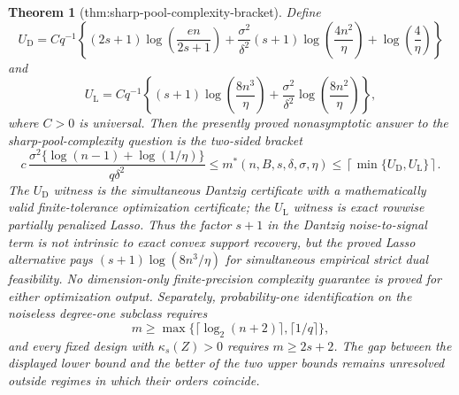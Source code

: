 \documentclass{article}
\newtheorem{theorem}{Theorem}
\begin{document}
\begin{theorem}[thm:sharp-pool-complexity-bracket]\label{thm:sharp-pool-complexity-bracket}
Define
\[
 U_{\mathrm D}=Cq^{-1}\left\{(2s+1)\log\!\left(\frac{en}{2s+1}\right)
 +\frac{\sigma^2}{\delta^2}(s+1)\log\!\left(\frac{4n^2}{\eta}\right)
 +\log\!\left(\frac4\eta\right)\right\}
\]
and
\[
 U_{\mathrm L}=Cq^{-1}\left\{(s+1)\log\!\left(\frac{8n^3}{\eta}\right)
 +\frac{\sigma^2}{\delta^2}\log\!\left(\frac{8n^2}{\eta}\right)\right\},
\]
where \(C>0\) is universal.  Then the presently proved nonasymptotic answer to the sharp-pool-complexity question is the two-sided bracket
\[
 c\,\frac{\sigma^2\{\log(n-1)+\log(1/\eta)\}}{q\delta^2}
 \le m^*(n,B,s,\delta,\sigma,\eta)
 \le \left\lceil\min\{U_{\mathrm D},U_{\mathrm L}\}\right\rceil.
\]
The \(U_{\mathrm D}\) witness is the simultaneous Dantzig certificate with a mathematically valid finite-tolerance optimization certificate; the \(U_{\mathrm L}\) witness is exact rowwise partially penalized Lasso.  Thus the factor \(s+1\) in the Dantzig noise-to-signal term is not intrinsic to exact convex support recovery, but the proved Lasso alternative pays \((s+1)\log(8n^3/\eta)\) for simultaneous empirical strict dual feasibility.  No dimension-only finite-precision complexity guarantee is proved for either optimization output.  Separately, probability-one identification on the noiseless degree-one subclass requires
\[
 m\ge\max\{\lceil\log_2(n+2)\rceil,\lceil1/q\rceil\},
\]
and every fixed design with \(\kappa_s(Z)>0\) requires \(m\ge2s+2\).  The gap between the displayed lower bound and the better of the two upper bounds remains unresolved outside regimes in which their orders coincide.
\end{theorem}
\end{document}
